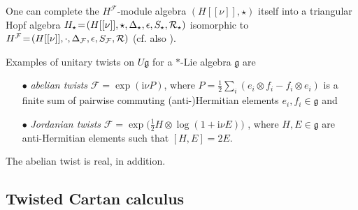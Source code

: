 \documentclass[a4paper,11pt]{article}
\begin{document}
\noindent
One can complete \cite{GurevichMajid1994,Aschieri2006}  the $H^\mathcal{F}$-module algebra $(H[[\nu]],\star)$ itself into a triangular Hopf algebra $H_\star\!=\!(H[[\nu]],\star,%
\Delta_\star,\epsilon,S_\star,{\cal R}_\star)$  isomorphic  to $H^\mathcal{F}\!=\!(H[[\nu]],\cdot,%
\Delta_\mathcal{F},\epsilon,S_\mathcal{F},{\cal R})$  (cf. also \cite{Fio98JMP,Fio00RMP,Fiore2010}).


Examples of unitary twists on $U\mathfrak{g}$ for a $*$-Lie algebra $\mathfrak{g}$ are
\begin{enumerate}
\item[$\bullet$] \textit{abelian twists} $\mathcal{F}=\exp(\mathrm{i}\nu P)$,
where $P=\frac{1}{2}\sum_i(e_i\otimes f_i-f_i\otimes e_i)$ \cite{Reshetikhin1990}
is a finite sum of pairwise commuting (anti-)Hermitian
elements $e_i,f_i\in\mathfrak{g}$ and

\item[$\bullet$] \textit{Jordanian twists} $\mathcal{F}=\exp\big(\frac{1}{2}H\otimes\log(1+\mathrm{i}\nu E)\big)$ \cite{Ogievetsky1992}, where
$H,E\in\mathfrak{g}$ are anti-Hermitian elements such that $[H,E]=2E$.
\end{enumerate}
The abelian twist is real, in addition.

\subsection{Twisted Cartan calculus}\label{TwistedCC}
\end{document}

